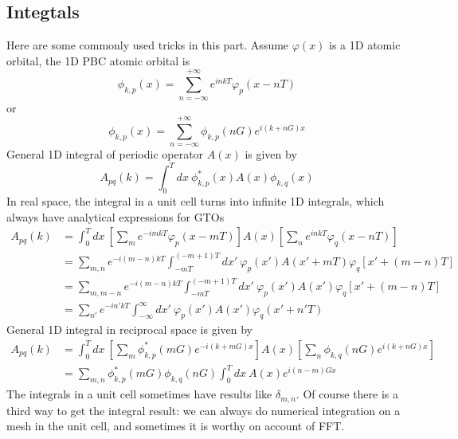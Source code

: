 \documentclass{article}
\begin{document}
    \subsection{Integtals}
        Here are some commonly used tricks in this part. 
        Assume $\varphi(x)$ is a 1D atomic orbital, the 1D PBC atomic orbital is
        $$ \phi_{k,p}(x) = \sum_{n=-\infty}^{+\infty}e^{inkT}\varphi_p(x-nT) $$
        or
        $$ \phi_{k,p}(x) = \sum_{n=-\infty}^{+\infty}\phi_{k,p}(nG)e^{i(k+nG)x} $$
        General 1D integral of periodic operator $A(x)$ is given by
        $$ A_{pq}(k) = \int_0^Tdx\ \phi_{k,p}^*(x)A(x)\phi_{k,q}(x) $$
        In real space, the integral in a unit cell turns into infinite 1D integrals, 
        which always have analytical expressions for GTOs
        \begin{align*}
            A_{pq}(k) &= \int_0^Tdx\ \left[\sum_{m}e^{-imkT}\varphi_p(x-mT)\right]A(x)\left[\sum_{n}e^{inkT}\varphi_q(x-nT)\right] \\
            &= \sum_{m,n}e^{-i(m-n)kT}\int_{-mT}^{(-m+1)T}dx'\ \varphi_p(x')A(x'+mT)\varphi_q[x'+(m-n)T] \\
            &= \sum_{m,m-n}e^{-i(m-n)kT}\int_{-mT}^{(-m+1)T}dx'\ \varphi_p(x')A(x')\varphi_q[x'+(m-n)T] \\
            &= \sum_{n'}e^{-in'kT}\int_{-\infty}^{\infty}dx'\ \varphi_p(x')A(x')\varphi_q(x'+n'T)
        \end{align*}
        General 1D integral in reciprocal space is given by
        \begin{align*}
            A_{pq}(k) &= \int_0^Tdx\ \left[\sum_m\phi_{k,p}^*(mG)e^{-i(k+mG)x}\right]A(x)\left[\sum_n\phi_{k,q}(nG)e^{i(k+nG)x}\right] \\
            &= \sum_{m,n}\phi_{k,p}^*(mG)\phi_{k,q}(nG)\int_0^Tdx\ A(x)e^{i(n-m)Gx}
        \end{align*}
        The integrals in a unit cell sometimes have results like $\delta_{m,n}$.
        Of course there is a third way to get the integral result:
        we can always do numerical integration on a mesh in the unit cell,
        and sometimes it is worthy on account of FFT.
        
\end{document}
